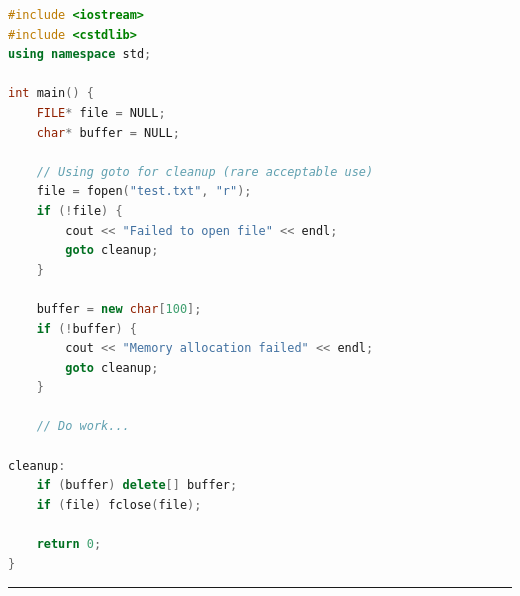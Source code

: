 \begin{lstlisting}[language={C++}]
#include <iostream>
#include <cstdlib>
using namespace std;

int main() {
    FILE* file = NULL;
    char* buffer = NULL;
    
    // Using goto for cleanup (rare acceptable use)
    file = fopen("test.txt", "r");
    if (!file) {
        cout << "Failed to open file" << endl;
        goto cleanup;
    }
    
    buffer = new char[100];
    if (!buffer) {
        cout << "Memory allocation failed" << endl;
        goto cleanup;
    }
    
    // Do work...
    
cleanup:
    if (buffer) delete[] buffer;
    if (file) fclose(file);
    
    return 0;
}
\end{lstlisting}

\begin{center}\rule{0.5\linewidth}{0.5pt}\end{center}
